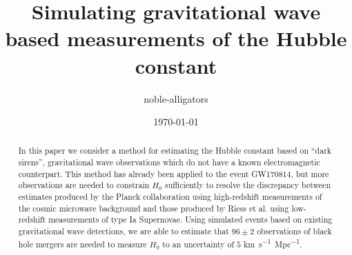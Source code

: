 \documentclass[a4paper, amsfonts, amssymb, amsmath, reprint, showkeys, nofootinbib, twoside]{revtex4-1}
\begin{document}
\title{Simulating gravitational wave based measurements of the Hubble constant}

\author{noble-alligators}

\date{\today} %

\begin{abstract}
    In this paper we consider a method for estimating the Hubble constant based on ``dark sirens'', gravitational wave observations which do not have a known electromagnetic counterpart. This method has already been applied to the event GW170814, but more observations are needed to constrain $H_0$ sufficiently to resolve the discrepancy between estimates produced by the Planck collaboration using high-redshift measurements of the cosmic microwave background and those produced by Riess et al. using low-redshift measurements of type Ia Supernovae. Using simulated events based on existing gravitational wave detections, we are able to estimate that $96\pm 2$ observations of black hole mergers are needed to measure $H_0$ to an uncertainty of $5$ \si{km.s^{-1}.Mpc^{-1}}.
\end{abstract}


\maketitle




%


%

%
%


\appendix

\end{document}
